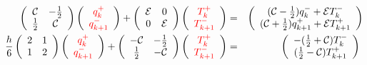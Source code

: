 \begin{eqnarray}
\left(
\begin{array}{cc}
  {\cal C}  &  -\frac{1}{2}\\
   \frac{1}{2}  &  {\cal C}
\end{array}
\right)
\left(
\begin{array}{cc}
     {\color{red}{q_k^+}}  \\
     {\color{red}{q_{k+1}^-}}
\end{array}
\right)
+
\left(
\begin{array}{cc}
  {\cal E} &  0\\
   0  &  {\cal E}
\end{array}
\right)
\left(
\begin{array}{cc}
     {\color{red}{T_k^+}}  \\
     {\color{red}{T_{k+1}^-}}
\end{array}
\right)
&=&
\left(
\begin{array}{cc}
      ({\cal C}-\frac{1}{2})q_k^-+{\cal{E}} T_k^-  \\
      ({\cal C}+\frac{1}{2})q_{k+1}^++{\cal{E}} T_{k+1}^+
\end{array}
\right)
\nonumber 
\\
\frac{h}{6}
\left(
\begin{array}{cc}
  2  &  1\\
   1 & 2
\end{array}
\right)
\left(
\begin{array}{cc}
     {\color{red}{q_k^+}}  \\
     {\color{red}{q_{k+1}^-}}
\end{array}
\right)
+
\left(
\begin{array}{cc}
  -{\cal C} &  -\frac{1}{2}\\
   \frac{1}{2}  &  -{\cal C}
\end{array}
\right)
\left(
\begin{array}{cc}
     {\color{red}{T_k^+}}  \\
     {\color{red}{T_{k+1}^-}}
\end{array}
\right)
&=&
\left(
\begin{array}{cc}
     -(\frac{1}{2}+{\cal{C}}) T_k^-  \\
      (\frac{1}{2}-{\cal{C}}) T_{k+1}^+
\end{array}
\right)\nonumber \
\end{eqnarray}



